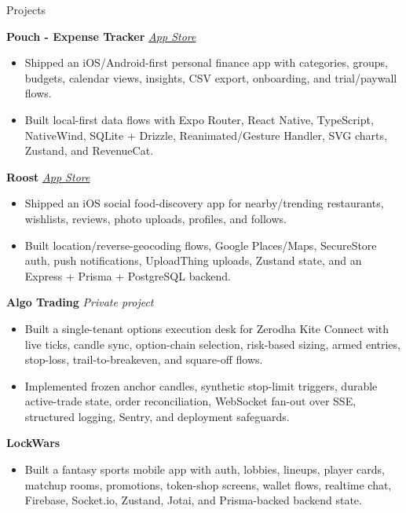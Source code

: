 \documentclass{resume}
\begin{document}
\begin{rSection}{Projects}

{\bf Pouch - Expense Tracker} \hfill \href{https://apps.apple.com/us/app/pouch-expense-tracker/id6779575380}{\em App Store}
\begin{itemize}
  \item Shipped an iOS/Android-first personal finance app with categories, groups, budgets, calendar views, insights, CSV export, onboarding, and trial/paywall flows.
  \vspace{-0.2cm}\item Built local-first data flows with Expo Router, React Native, TypeScript, NativeWind, SQLite + Drizzle, Reanimated/Gesture Handler, SVG charts, Zustand, and RevenueCat.
\end{itemize}

{\bf Roost} \hfill \href{https://apps.apple.com/us/app/roost-v2/id6743691245}{\em App Store}
\begin{itemize}
  \item Shipped an iOS social food-discovery app for nearby/trending restaurants, wishlists, reviews, photo uploads, profiles, and follows.
  \vspace{-0.2cm}\item Built location/reverse-geocoding flows, Google Places/Maps, SecureStore auth, push notifications, UploadThing uploads, Zustand state, and an Express + Prisma + PostgreSQL backend.
\end{itemize}

{\bf Algo Trading} \hfill {\em Private project}
\begin{itemize}
  \item Built a single-tenant options execution desk for Zerodha Kite Connect with live ticks, candle sync, option-chain selection, risk-based sizing, armed entries, stop-loss, trail-to-breakeven, and square-off flows.
  \vspace{-0.2cm}\item Implemented frozen anchor candles, synthetic stop-limit triggers, durable active-trade state, order reconciliation, WebSocket fan-out over SSE, structured logging, Sentry, and deployment safeguards.
\end{itemize}

{\bf LockWars}
\begin{itemize}
  \item Built a fantasy sports mobile app with auth, lobbies, lineups, player cards, matchup rooms, promotions, token-shop screens, wallet flows, realtime chat, Firebase, Socket.io, Zustand, Jotai, and Prisma-backed backend state.
\end{itemize}

\end{rSection}
\end{document}
